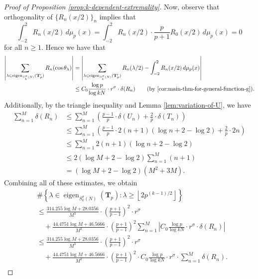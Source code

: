 \documentclass[11pt,letterpaper,reqno]{amsart}
\theoremstyle{definition}
\numberwithin{equation}{section}
\numberwithin{figure}{section}
\numberwithin{table}{section}
\newcommand{\lrp}[1]{\left(#1\right)}
\begin{document}
\begin{proof}[Proof of Proposition \ref{prop:k-dependent-extremality}]
    Now, observe that orthogonality of $\{R_n(x/2)\}_n$ implies that $$\int_{-2}^2 R_n(x/2) \, d\mu_p(x) = \int_{-2}^2 R_n(x/2) \cdot \frac{p}{p + 1}R_0(x/2) \, d\mu_p(x) = 0$$ 
    for all $n \geq 1$. Hence we have that
    \begin{align}
        \left| \sum_{\lambda \in \operatorname{eigen}_{ S_k^\sigma(N)}(\mathbf{T}_p')} R_n(\cos \theta_\lambda) \right| 
        &=
        \left| \sum_{\lambda \in \operatorname{eigen}_{ S_k^\sigma(N)}(\mathbf{T}_p')} R_n(\lambda/2)  - \int_{-2}^2 R_n(x/2) \, d\mu_p(x)\right| \\
        &\leq C_0 \frac{\log p}{\log kN} \cdot r^\sigma \cdot \delta(R_n) \qquad \text{(by \eqref{cor:main-thm-for-general-function-g})}.
    \end{align}
    Additionally, by the triangle inequality and Lemma \ref{lem:variation-of-U}, we have
    \begin{align*}
        \sum_{n = 1}^M \delta(R_n) 
        &\leq \sum_{n = 1}^M
        \lrp{\frac{p - 1}{p} \cdot \delta(U_n) + \frac{2}{p} \cdot \delta(T_n)}\\
        &\leq \sum_{n = 1}^M 
        \lrp{\frac{p - 1}{p} \cdot 2(n + 1) \left( \log n + 2 - \log 2 \right) + \frac{2}{p} \cdot 2n}\\
        &\leq \sum_{n = 1}^M 2  (n + 1) \left( \log n + 2 - \log 2 \right)\\
        &\leq   2   \left( \log M + 2 - \log 2 \right) \sum_{n = 1}^M  (n + 1)
        \\
        &=  \left( \log M + 2 - \log 2\right) \left( M^2 + 3M \right).
    \end{align*}
    Combining all of these estimates, we obtain
    \begin{align}
        & \#\left\{ \lambda \in \operatorname{eigen}_{ S_k^\sigma(N)} \! \left( \mathbf{T}_{p}  \right) :  \lambda  \geq \left\lfloor 2 p^{(k - 1)/2}  \right\rfloor \right\}\\
        &\leq \frac{314.255 \log M + 28.0356}{M^3} \cdot \left( \frac{p + 1}{p - 1} \right)^2 \cdot r^\sigma\\
        &\quad +  \frac{44.4751 \log M + 46.5666}{M^2}  \cdot \left( \frac{p + 1}{p - 1} \right)^2   \sum_{n = 1}^M  \left| C_0 \frac{\log p}{\log kN} \cdot r^\sigma \cdot \delta(R_n) \right|\\
        &\leq \frac{314.255 \log M + 28.0356}{M^3} \cdot \left( \frac{p + 1}{p - 1} \right)^2 \cdot r^\sigma\\
        & \quad +  \frac{44.4751 \log M + 46.5666}{M^2}  \cdot \left( \frac{p + 1}{p - 1} \right)^2  \cdot C_0 \frac{\log p}{\log kN} \cdot r^\sigma \cdot \sum_{n = 1}^M \delta(R_n).\\

\end{align}
\end{proof}
\end{document}

